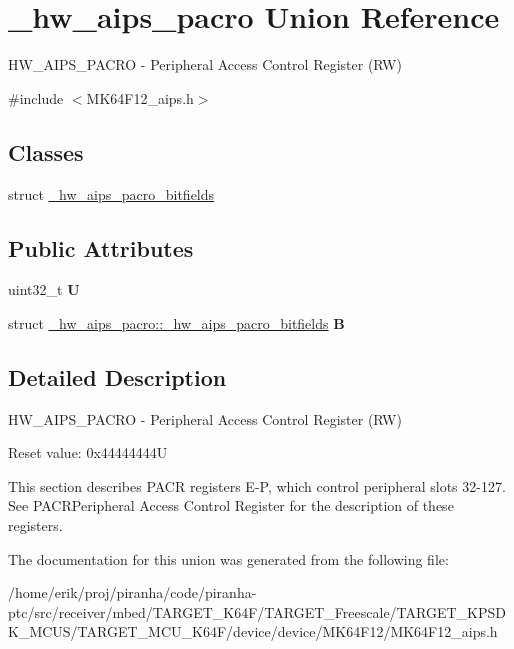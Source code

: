 \hypertarget{union__hw__aips__pacro}{}\section{\+\_\+hw\+\_\+aips\+\_\+pacro Union Reference}
\label{union__hw__aips__pacro}


H\+W\+\_\+\+A\+I\+P\+S\+\_\+\+P\+A\+C\+RO -\/ Peripheral Access Control Register (RW)  




{\ttfamily \#include $<$M\+K64\+F12\+\_\+aips.\+h$>$}

\subsection*{Classes}
\begin{DoxyCompactItemize}
\item 
struct \hyperlink{struct__hw__aips__pacro_1_1__hw__aips__pacro__bitfields}{\+\_\+hw\+\_\+aips\+\_\+pacro\+\_\+bitfields}
\end{DoxyCompactItemize}
\subsection*{Public Attributes}
\begin{DoxyCompactItemize}
\item 
uint32\+\_\+t {\bfseries U}\hypertarget{union__hw__aips__pacro_ab413244263ae216c6a36be923555b2fa}{}\label{union__hw__aips__pacro_ab413244263ae216c6a36be923555b2fa}

\item 
struct \hyperlink{struct__hw__aips__pacro_1_1__hw__aips__pacro__bitfields}{\+\_\+hw\+\_\+aips\+\_\+pacro\+::\+\_\+hw\+\_\+aips\+\_\+pacro\+\_\+bitfields} {\bfseries B}\hypertarget{union__hw__aips__pacro_a133b76177bec0626897b3f3761dafe36}{}\label{union__hw__aips__pacro_a133b76177bec0626897b3f3761dafe36}

\end{DoxyCompactItemize}


\subsection{Detailed Description}
H\+W\+\_\+\+A\+I\+P\+S\+\_\+\+P\+A\+C\+RO -\/ Peripheral Access Control Register (RW) 

Reset value\+: 0x44444444U

This section describes P\+A\+CR registers E-\/P, which control peripheral slots 32-\/127. See P\+A\+C\+R\+Peripheral Access Control Register for the description of these registers. 

The documentation for this union was generated from the following file\+:\begin{DoxyCompactItemize}
\item 
/home/erik/proj/piranha/code/piranha-\/ptc/src/receiver/mbed/\+T\+A\+R\+G\+E\+T\+\_\+\+K64\+F/\+T\+A\+R\+G\+E\+T\+\_\+\+Freescale/\+T\+A\+R\+G\+E\+T\+\_\+\+K\+P\+S\+D\+K\+\_\+\+M\+C\+U\+S/\+T\+A\+R\+G\+E\+T\+\_\+\+M\+C\+U\+\_\+\+K64\+F/device/device/\+M\+K64\+F12/M\+K64\+F12\+\_\+aips.\+h\end{DoxyCompactItemize}
